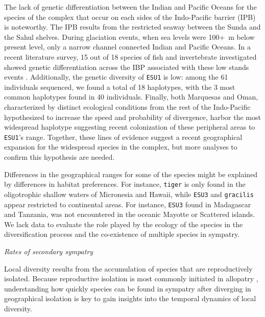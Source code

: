 \documentclass[12pt,letterpaper]{article}\usepackage[]{graphicx}\usepackage[]{color}
\renewcommand{\subsection}[1]{%
\bigskip
\begin{center}
\begin{large}
\normalfont\itshape #1
\end{large}
\end{center}}
\begin{document}
The lack of genetic differentiation between the Indian and Pacific Oceans for
the species of the complex that occur on each sides of the Indo-Pacific barrier
(IPB) is noteworthy. The IPB results from the restricted seaway between the
Sunda and the Sahul shelves. During glaciation events, when sea levels were
100+~m below present level, only a narrow channel connected Indian and Pacific
Oceans. In a recent literature survey, 15 out of 18 species of fish and
invertebrate investigated showed genetic differentiation across the IBP
associated with these low stands events \citep{Gaither2010}. Additionally, the
genetic diversity of \texttt{ESU1} is low: among the 61 individuals sequenced,
we found a total of 18 haplotypes, with the 3 most common haplotypes found in 40
individuals. Finally, both Marquesas and Oman, characterized by distinct
ecological conditions from the rest of the Indo-Pacific hypothesized to increase
the speed and probability of divergence, harbor the most widespread haplotype
suggesting recent colonization of these peripheral areas to \texttt{ESU1}'s
range. Together, these lines of evidence suggest a recent geographical expansion
for the widespread species in the complex, but more analyses to confirm this
hypothesis are needed.

Differences in the geographical ranges for some of the species might be
explained by differences in habitat preferences. For instance, \texttt{tiger} is
only found in the oligotrophic shallow waters of Micronesia and Hawaii, while
\texttt{ESU3} and \texttt{gracilis} appear restricted to continental areas. For
instance, \texttt{ESU3} found in Madagascar and Tanzania, was not encountered in
the oceanic Mayotte or Scattered islands. We lack data to evaluate the role
played by the ecology of the species in the diversification process and the
co-existence of multiple species in sympatry.


\subsection{Rates of secondary sympatry}

Local diversity results from the accumulation of species that are reproductively
isolated. Because reproductive isolation is most commonly initiated in allopatry
\citep{Coyne2004}, understanding how quickly species can be found in sympatry
after diverging in geographical isolation is key to gain insights into the
temporal dynamics of local diversity.
\end{document}
